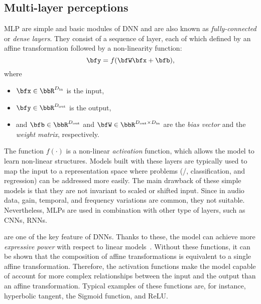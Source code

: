 \subsection{Multi-layer perceptions}\label{subsec:lantern:mlp}
\acf{MLP} are simple and basic modules of \ac{DNN} and are also known as \textit{fully-connected} or \textit{dense layers}.
They consist of a sequence of layer, each of which defined by an affine transformation followed by a non-linearity function:
\begin{equation*}
    \bfy = f(\bfW \bfx + \bfb)
    ,
\end{equation*}
where
\newcommand{\Din}{\ensuremath{D_{\text{in}}}}
\newcommand{\Dout}{\ensuremath{D_{\text{out}}}}
\begin{itemize}
    \item $\bfx\in\bbR^{\Din}$ is the input,
    \item $\bfy\in\bbR^{\Dout}$ is the output,
    \item and $\bfb\in\bbR^{\Dout}$ and $\bfW\in\bbR^{\Dout \times \Din}$ are the \textit{bias vector} and the \textit{weight matrix}, respectively.
\end{itemize}
The function $f(\cdot)$ is a non-linear \textit{activation} function, which allows the model to learn non-linear structures.
Models built with these layers are typically used to map the input to a representation space where problems (\eg/, classification, and regression) can be addressed more easily.
The main drawback of these simple models is that they are not invariant to scaled or shifted input.
Since in audio data, gain, temporal, and frequency variations are common, they not suitable.
Nevertheless, \acp{MLP} are used in combination with other type of layers, such as \acfp{CNN}, \acfp{RNN}.

 are one of the key feature of \acp{DNN}.
Thanks to these, the model can achieve more \textit{expressive power} with respect to linear models~.
Without these functions, it can be shown that the composition of affine transformations is equivalent to a single affine transformation.
Therefore, the activation functions make the model capable of account for more complex relationships between the input and the output than an affine transformation.
Typical examples of these functions are, for instance, hyperbolic tangent, the Sigmoid function, and \acf{ReLU}.

